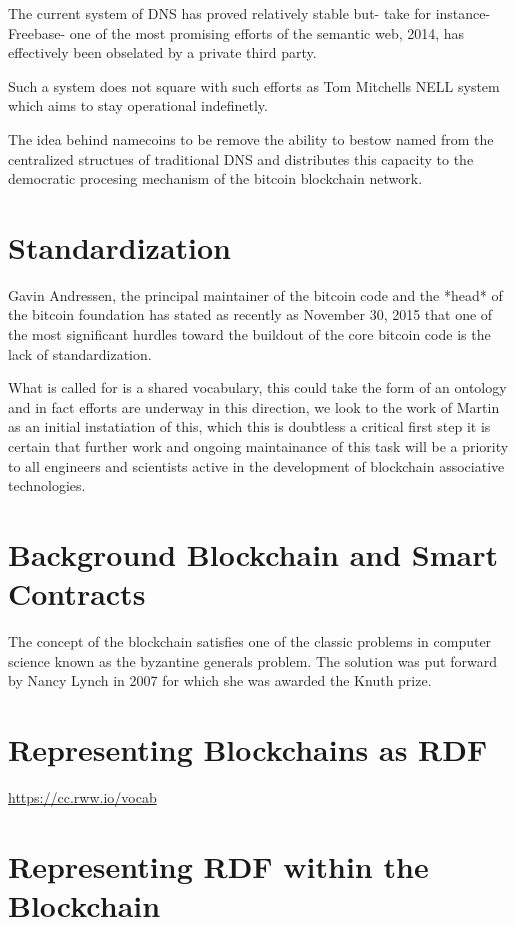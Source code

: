 \documentclass[runningheads,a4paper]{llncs}
\begin{document}
The current system of DNS has proved relatively stable but- take for instance- Freebase- one of the most promising efforts of the semantic web, 2014, has effectively been obselated by a private third party. 

Such a system does not square with such efforts as Tom Mitchells NELL system which aims to stay operational indefinetly. 

The idea behind namecoins to be remove the ability to bestow named from the centralized structues of traditional DNS and distributes this capacity to the democratic procesing mechanism of the bitcoin blockchain network. 




\section{Standardization}

Gavin Andressen, the principal maintainer of the bitcoin code and the *head* of the bitcoin foundation has stated as recently as November 30, 2015 that one of the most significant hurdles toward the buildout of the core bitcoin code is the lack of standardization. 

What is called for is a shared vocabulary, this could take the form of an ontology and in fact efforts are underway in this direction, we look to the work of Martin as an initial instatiation of this, which this is doubtless a critical first step it is certain that further work and ongoing maintainance of this task will be a priority to all engineers and scientists active in the development of blockchain associative technologies. 


\section{Background Blockchain and Smart Contracts}

The concept of the blockchain satisfies one of the classic problems in computer science known as the byzantine generals problem. The solution was put forward by Nancy Lynch in 2007 for which she was awarded the Knuth prize. 


\section{Representing Blockchains as RDF}

\url{https://cc.rww.io/vocab}

\section{Representing RDF within the Blockchain}
\end{document}
